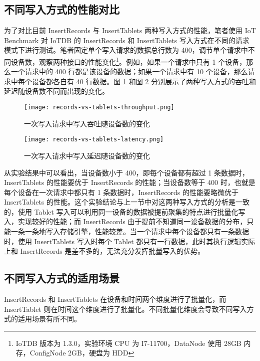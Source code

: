 \subsection{不同写入方式的性能对比\label{sec:chap3-sec1-1}}
为了对比目前 InsertRecords 与 InsertTablets 两种写入方式的性能，笔者使用 IoT Benchmark\cite{liu2019benchmarking} 对 IoTDB 的 InsertRecords 和 InsertTablets 写入方式在不同的请求模式下进行测试。笔者固定单个写入请求的数据总行数为 400，调节单个请求中不同设备数，观察两种接口的性能变化\footnote{IoTDB 版本为 1.3.0，实验环境 CPU 为 I7-11700，DataNode 使用 28GB 内存，ConfigNode 2GB，硬盘为 HDD}。例如，如果一个请求中只有 1 个设备，那么一个请求中的 400 行都是该设备的数据；如果一个请求中有 10 个设备，那么请求中每个设备都各自有 40 行数据。图 \ref{fig:records-vs-tablets-throughput} 和图 \ref{fig:records-vs-tablets-latency} 分别展示了两种写入方式的吞吐和延迟随设备数不同而出现的变化。

\begin{figure}
  \centering 
  \texttt{[image: records-vs-tablets-throughput.png]}
  \caption{一次写入请求中写入吞吐随设备数的变化}
  \label{fig:records-vs-tablets-throughput}
\end{figure}

\begin{figure}
  \centering
  \texttt{[image: records-vs-tablets-latency.png]}
  \caption{一次写入请求中写入延迟随设备数的变化}
  \label{fig:records-vs-tablets-latency}
\end{figure}


从实验结果中可以看出，当设备数小于 400，即每个设备都有超过 1 条数据时，InsertTablets 的性能要优于 InsertRecords 的性能；当设备数等于 400 时，也就是每个设备在一次请求中都只有 1 条数据时，InsertRecords 的性能要略微优于 InsertTablets 的性能。这个实验结论与上一节中对这两种写入方式的分析是一致的，使用 Tablet 写入可以利用同一设备的数据被提前聚集的特点进行批量化写入，实现较好的性能；而 InsertRecords 由于提前不知道同一设备数据的分布，只能一条一条地写入存储引擎，性能较差。当一个请求中每个设备都只有一条数据时，使用 InsertTablets 写入时每个 Tablet 都只有一行数据，此时其执行逻辑实际上和 InsertRecords 是差不多的，无法充分发挥批量写入的优势。


\subsection{不同写入方式的适用场景}
InsertRecords 和 InsertTablets 在设备和时间两个维度进行了批量化，而 InsertTablet 则在时间这个维度进行了批量化。不同批量化维度会导致不同写入方式的适用场景有所不同。

